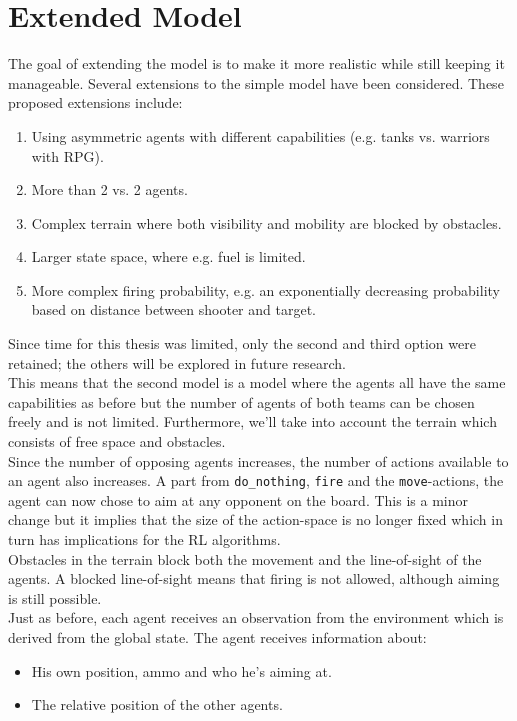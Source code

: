 \section{Extended Model}
\label{sec:extended_model}
The goal of extending the model is to make it more realistic while still keeping it manageable. Several extensions to the simple model have been considered. These proposed extensions include:
\begin{enumerate}
    \item Using asymmetric agents with different capabilities (e.g. tanks vs. warriors with RPG).
    \item More than 2 vs. 2 agents.
    \item Complex terrain where both visibility and mobility are blocked by obstacles.
    \item Larger state space, where e.g. fuel is limited.
    \item More complex firing probability, e.g. an exponentially decreasing probability based on distance between shooter and target.
\end{enumerate}
Since time for this thesis was limited, only the second and third option were retained; the others will be explored in future research.\\
This means that the second model is a model where the agents all have the same capabilities as before but the number of agents of both teams can be chosen freely and is not limited. Furthermore, we'll take into account the terrain which consists of free space and obstacles.\\
Since the number of opposing agents increases, the number of actions available to an agent also increases. A part from {\tt do\_nothing}, {\tt fire} and the {\tt move}-actions, the agent can now chose to aim at any opponent on the board. This is a minor change but it implies that the size of the action-space is no longer fixed which in turn has implications for the RL algorithms.\\
Obstacles in the terrain block both the movement and the line-of-sight of the agents. A blocked line-of-sight means that firing is not allowed, although aiming is still possible.\\
Just as before, each agent receives an observation from the environment which is derived from the global state. The agent receives information about:
\begin{itemize}
    \item His own position, ammo and who he's aiming at.
    \item The relative position of the other agents.
\end{itemize}
